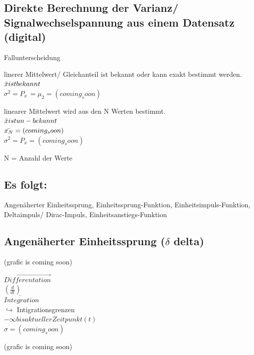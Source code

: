 \documentclass{article}
\begin{document}
\subsection*{Direkte Berechnung der Varianz/ Signalwechselspannung aus einem Datensatz (digital)}

\begin{center}
    Fallunterscheidung
\end{center}
\begin{multicols}{2}
    linerer Mittelwert/ Gleichanteil ist bekannt oder kann exakt bestimmt werden. \\
    $\Bar{x} ist bekannt$ \\
    $\sigma^2 = P_{x~} = \mu_2 = (coming_soon)$
    
    \columnbreak
    linearer Mittelwert wird aus den N Werten bestimmt. \\
    $\Bar{x} ist un-bekannt$ \\
    $\Bar{x_N} = (coming_soon)$ \\
    $\sigma^2 = P_x = (coming_soon)$
    
\end{multicols}
\begin{center}
    N = Anzahl der Werte
\end{center}

\subsection*{Es folgt:}
Angenäherter Einheitssprung, Einheitssprung-Funktion, Einheitsimpuls-Funktion, Deltaimpuls/ Dirac-Impuls, Einheitsanstiegs-Funktion

\subsection*{Angenäherter Einheitssprung ($\delta$ delta)}
\begin{multicols}{3}
    (grafic is coming soon)

    \columnbreak

    \begin{center}
    $\overrightarrow{Differentation}$ \\
    $(\frac{d}{dt})$ \\
    \vspace{1em}
    $\overleftarrow{Integration}$ \\
    $\hookrightarrow$ Intigrationsgrenzen \\
    $-\infty bis aktueller Zeitpunkt (t)$ \\
    $\sigma = (coming_soon)$
    \end{center}

    \columnbreak
    (grafic is coming soon)
\end{multicols}
\end{document}
